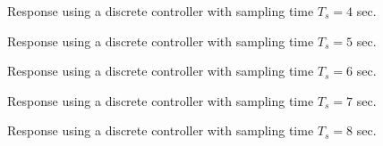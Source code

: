 \begin{figure}[H]\centering
	\centering
	\scalebox{1}{}
  \caption{Response using a discrete controller with sampling time $T_s = 4$ sec.}
  \label{fig:Q8.4}
\end{figure}

\begin{figure}[H]\centering
	\centering
	\scalebox{1}{}
  \caption{Response using a discrete controller with sampling time $T_s = 5$ sec.}
  \label{fig:Q8.5}
\end{figure}

\begin{figure}[H]\centering
	\centering
	\scalebox{1}{}
  \caption{Response using a discrete controller with sampling time $T_s = 6$ sec.}
  \label{fig:Q8.6}
\end{figure}

\begin{figure}[H]\centering
	\centering
	\scalebox{1}{}
  \caption{Response using a discrete controller with sampling time $T_s = 7$ sec.}
  \label{fig:Q8.7}
\end{figure}

\begin{figure}[H]\centering
	\centering
	\scalebox{1}{}
  \caption{Response using a discrete controller with sampling time $T_s = 8$ sec.}
  \label{fig:Q8.8}
\end{figure}
